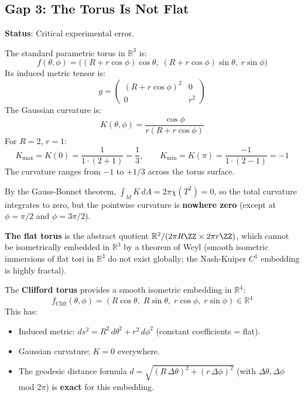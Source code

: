 \documentclass{article}
\newcommand{\RR}{\mathbb{R}}
\begin{document}
\subsection{Gap 3: The Torus Is Not Flat}
\label{sec:torus}

\textbf{Status}: Critical experimental error.

\begin{proofbox}
The standard parametric torus in $\RR^3$ is:
\[
    f(\theta, \phi) = \bigl((R+r\cos\phi)\cos\theta,\;
    (R+r\cos\phi)\sin\theta,\; r\sin\phi\bigr)
\]
Its induced metric tensor is:
\[
    g =
    \begin{pmatrix}
        (R+r\cos\phi)^2 & 0 \\
        0 & r^2
    \end{pmatrix}
\]
The Gaussian curvature is:
\begin{equation}
    K(\theta,\phi) = \frac{\cos\phi}{r(R + r\cos\phi)}
\end{equation}
For $R = 2$, $r = 1$:
\[
    K_{\max} = K(0) = \frac{1}{1\cdot(2+1)} = \frac{1}{3},
    \qquad
    K_{\min} = K(\pi) = \frac{-1}{1\cdot(2-1)} = -1
\]
The curvature ranges from $-1$ to $+1/3$ across the torus surface.

By the Gauss-Bonnet theorem, $\int_M K\,dA = 2\pi\chi(T^2) = 0$, so the
total curvature integrates to zero, but the pointwise curvature is
\textbf{nowhere zero} (except at $\phi = \pi/2$ and $\phi = 3\pi/2$).
\end{proofbox}

\textbf{The flat torus} is the abstract quotient $\RR^2/(2\pi R\ZZ \times
2\pi r\ZZ)$, which cannot be isometrically embedded in $\RR^3$ by a theorem
of Weyl (smooth isometric immersions of flat tori in $\RR^3$ do not exist
globally; the Nash-Kuiper $C^1$ embedding is highly fractal).

The \textbf{Clifford torus} provides a smooth isometric embedding in $\RR^4$:
\begin{equation}\label{eq:clifford}
    f_{\text{Cliff}}(\theta, \phi)
    = (R\cos\theta,\; R\sin\theta,\; r\cos\phi,\; r\sin\phi) \in \RR^4
\end{equation}
This has:
\begin{itemize}
    \item Induced metric: $ds^2 = R^2\,d\theta^2 + r^2\,d\phi^2$ (constant
      coefficients = flat).
    \item Gaussian curvature: $K = 0$ everywhere.
    \item The geodesic distance formula
      $d = \sqrt{(R\,\Delta\theta)^2 + (r\,\Delta\phi)^2}$ (with
      $\Delta\theta, \Delta\phi$ mod $2\pi$) is \textbf{exact} for this embedding.
\end{itemize}
\end{document}

